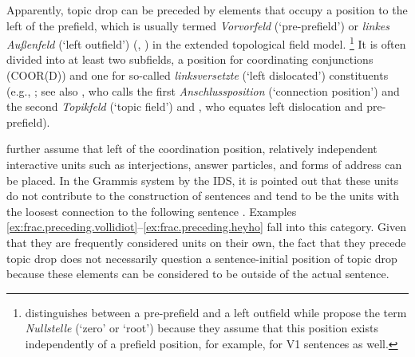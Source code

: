  
Apparently, topic drop can be preceded by elements that occupy a position to the left of the prefield, which is usually termed \textit{Vorvorfeld} (`pre-prefield')  or \textit{linkes Außenfeld} (`left outfield') (\cite[1577--1581]{zifonun.etal1997}, \cite{auer1997, gallmann2015, speyer.reich2020}) in the extended topological field model.%
\footnote{\citet{wollstein2014} distinguishes between a pre-prefield  and a left outfield while \citet{pasch.etal2003} propose the term \textit{Nullstelle} (`zero' or `root') because they assume that this position exists independently of a prefield position, for example, for V1 sentences as well.}
%
It is often divided into at least two subfields, a position for coordinating conjunctions  (COOR(D)) and one for so-called \textit{linksversetzte} (`left dislocated')  constituents (e.g., \cite{speyer.reich2020, pittner.berman2021}; see also \citet[55]{pafel2011}, who calls the first \textit{Anschlussposition} (`connection position') and the second \textit{Topikfeld} (`topic field') and \citet[410]{eisenberg2020}, who equates left dislocation  and pre-prefield). 

\citet[1577]{zifonun.etal1997} further assume that left of the coordination position, relatively independent interactive units such as interjections, answer particles, and forms of address can be placed. 
In the Grammis system by the IDS, it is pointed out that these units do not contribute to the construction of sentences and tend to be the units with the loosest connection to the following sentence \citep{aussenfeld}.
Examples \ref{ex:frac.preceding.vollidiot}--\ref{ex:frac.preceding.heyho} fall into this category.
Given that they are frequently considered units on their own, the fact that they precede topic drop does not necessarily question a sentence-initial position of topic drop because these elements can be considered to be outside of the actual sentence.

